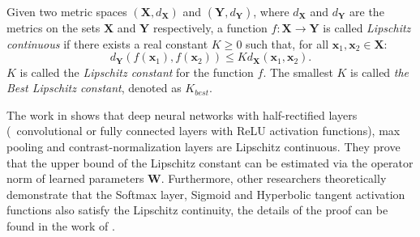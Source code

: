 \begin{definition}
	Given two metric spaces $(\mathbf{X}, d_\mathbf{X})$ and $(\mathbf{Y}, d_\mathbf{Y})$, where $d_\mathbf{X}$ and $d_\mathbf{Y}$ are the metrics on the sets $\mathbf{X}$ and $\mathbf{Y}$ respectively, a function $f: \mathbf{X}\rightarrow \mathbf{Y}$ is called {\em Lipschitz continuous} if there exists a real constant $K\geq0$ such that, for all $\mathbf{x}_1, \mathbf{x}_2 \in \mathbf{X}$:
	\begin{equation}
	 d_\mathbf{Y}(f(\mathbf{x}_1), f(\mathbf{x}_2)) \le K d_\mathbf{X}(\mathbf{x}_1, \mathbf{x}_2).
	\end{equation}
	$K$ is called the {\em Lipschitz constant} for the function $f$. The smallest $K$ is called {\em the Best Lipschitz constant}, denoted as $K_{best}$.
\end{definition}

The work in \cite{szegedy2014intriguing} shows that deep neural networks with half-rectified layers (\ie~convolutional or fully connected layers with ReLU activation functions), max pooling and contrast-normalization layers are Lipschitz continuous. They prove that the upper bound of the Lipschitz constant can be estimated via the operator norm of learned parameters $\mathbf{W}$. Furthermore, other researchers theoretically demonstrate that the Softmax layer, Sigmoid and Hyperbolic tangent activation functions also satisfy the Lipschitz continuity, the details of the proof can be found in the work of \cite{RHK2018}.





